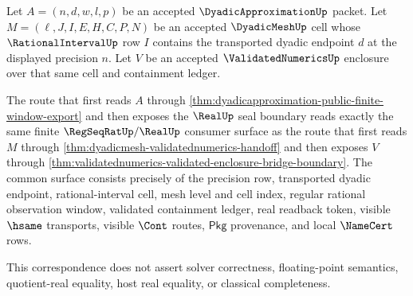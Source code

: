 \begin{theorem}
\label{thm:dyadicapproximation-validated-enclosure-route-commutation}
Let $A=(n,d,w,l,p)$ be an accepted $\DyadicApproximationUp$ packet. Let
$M=(\ell,J,I,E,H,C,P,N)$ be an accepted $\DyadicMeshUp$ cell whose
$\RationalIntervalUp$ row $I$ contains the transported dyadic endpoint $d$ at
the displayed precision $n$. Let $V$ be an accepted $\ValidatedNumericsUp$
enclosure over that same cell and containment ledger.

The route that first reads $A$ through
\autoref{thm:dyadicapproximation-public-finite-window-export} and then exposes
the $\RealUp$ seal boundary reads exactly the same finite
$\RegSeqRatUp/\RealUp$ consumer surface as the route that first reads $M$
through \autoref{thm:dyadicmesh-validatednumerics-handoff} and then exposes
$V$ through
\autoref{thm:validatednumerics-validated-enclosure-bridge-boundary}. The common
surface consists precisely of the precision row, transported dyadic endpoint,
rational-interval cell, mesh level and cell index, regular rational
observation window, validated containment ledger, real readback token, visible
$\hsame$ transports, visible $\Cont$ routes, $\mathsf{Pkg}$ provenance, and
local $\NameCert$ rows.

This correspondence does not assert solver correctness, floating-point
semantics, quotient-real equality, host real equality, or classical
completeness.
\end{theorem}
